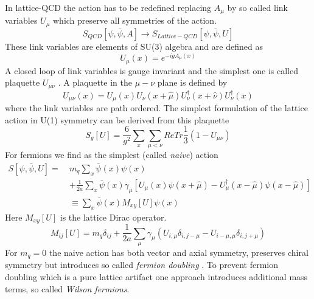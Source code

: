 	In lattice-QCD the action has to be redefined replacing $A_\mu$ by so called link variables $U_\mu$ which preserve all symmetries of the action.
	\begin{equation}
	    S_{QCD}[\psi,\bar{\psi},A] \rightarrow S_{Lattice-QCD}[\psi,\bar{\psi},U]
	\end{equation}
	These link variables are elements of SU(3) algebra and are defined as
	\begin{equation}
	    U_\mu(x) = e^{-igA_\mu(x)}
	\end{equation}
	A closed loop of link variables is gauge invariant and the simplest one is called plaquette $U_{\mu\nu}$ \cite{Rothe2012}. A plaquette in the $\mu - \nu$ plane is defined by
	\begin{equation}
	    U_{\mu\nu}(x) = U_\mu(x)U_\nu(x+\hat{\mu})U_\nu^\dagger(x+\hat{\nu})U_\nu^\dagger(x)
	\end{equation}
	where the link variables are path ordered. The simplest formulation of the lattice action in U(1) symmetry can be derived from this plaquette \cite{introduction_to_lattice_qcd}
	\begin{equation}
	    S_g[U] = \frac{6}{g^2}\sum_x\sum_{\mu<\nu}ReTr\frac{1}{3}(1-U_{\mu\nu})
	\end{equation}
	For fermions we find as the simplest (called \textit{naive}) action
	\begin{equation}\label{naive_lattice_action}
	    \begin{aligned}
	        S[\psi,\bar{\psi},U] =\ &m_q\sum_x\bar{\psi}(x)\psi(x)\\
	        &+ \frac{1}{2a}\sum_x\bar{\psi}(x)\gamma_\mu[U_\mu(x)\psi(x+\hat{\mu})-U_\mu^\dagger(x-\hat{\mu})\psi(x-\hat{\mu})]\\
	        &\equiv \sum_x\bar{\psi}(x)M_{xy}[U]\psi(x)
	    \end{aligned}
	\end{equation}
	Here $M_{xy}[U]$ is the lattice Dirac operator.
	\begin{equation}\label{naive_lattice_operator}
	    M_{ij}[U] = m_q\delta_{ij} + \frac{1}{2a}\sum_\mu\gamma_\mu(U_{i,\mu}\delta_{i,j-\mu} - U_{i-\mu,\mu}\delta_{i,j+\mu})
	\end{equation}
	For $m_q = 0$ the naive action  has both vector and axial symmetry, preserves chiral symmetry but introduces so called \textit{fermion doubling} \cite{introduction_to_lattice_qcd}. To prevent fermion doubling which is a pure lattice artifact one approach introduces additional mass terms, so called \textit{Wilson fermions}.
	
